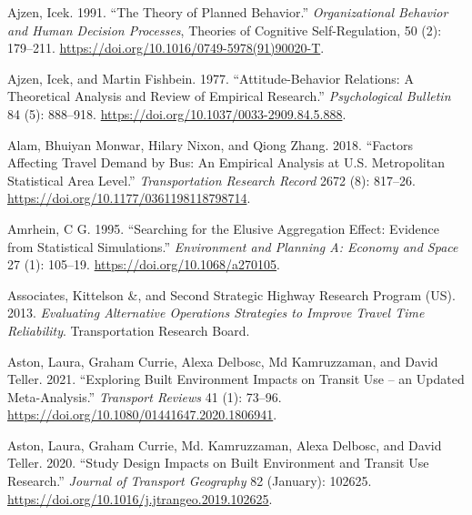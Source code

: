 \documentclass[
  12pt,
]{article}
\newlength{\cslhangindent}
\newlength{\cslentryspacingunit} %
\newenvironment{CSLReferences}[2] %
 {%
  \setlength{\parindent}{0pt}
  \ifodd #1
  \let\oldpar\par
  \def\par{\hangindent=\cslhangindent\oldpar}
  \fi
  \setlength{\parskip}{#2\cslentryspacingunit}
 }%
 {}
\begin{document}
\hypertarget{refs}{}
\begin{CSLReferences}{1}{0}
\leavevmode{}%
Ajzen, Icek. 1991. {``The Theory of Planned Behavior.''} \emph{Organizational Behavior and Human Decision Processes}, Theories of {Cognitive Self-Regulation}, 50 (2): 179--211. \url{https://doi.org/10.1016/0749-5978(91)90020-T}.

\leavevmode{}%
Ajzen, Icek, and Martin Fishbein. 1977. {``Attitude-Behavior Relations: {A} Theoretical Analysis and Review of Empirical Research.''} \emph{Psychological Bulletin} 84 (5): 888--918. \url{https://doi.org/10.1037/0033-2909.84.5.888}.

\leavevmode{}%
Alam, Bhuiyan Monwar, Hilary Nixon, and Qiong Zhang. 2018. {``Factors {Affecting Travel Demand} by {Bus}: {An Empirical Analysis} at {U}.{S}. {Metropolitan Statistical Area Level}.''} \emph{Transportation Research Record} 2672 (8): 817--26. \url{https://doi.org/10.1177/0361198118798714}.

\leavevmode{}%
Amrhein, C G. 1995. {``Searching for the {Elusive Aggregation Effect}: {Evidence} from {Statistical Simulations}.''} \emph{Environment and Planning A: Economy and Space} 27 (1): 105--19. \url{https://doi.org/10.1068/a270105}.

\leavevmode{}%
Associates, Kittelson \&, and Second Strategic Highway Research Program (US). 2013. \emph{Evaluating Alternative Operations Strategies to Improve Travel Time Reliability}. Transportation Research Board.

\leavevmode{}%
Aston, Laura, Graham Currie, Alexa Delbosc, Md Kamruzzaman, and David Teller. 2021. {``Exploring Built Environment Impacts on Transit Use -- an Updated Meta-Analysis.''} \emph{Transport Reviews} 41 (1): 73--96. \url{https://doi.org/10.1080/01441647.2020.1806941}.

\leavevmode{}%
Aston, Laura, Graham Currie, Md. Kamruzzaman, Alexa Delbosc, and David Teller. 2020. {``Study Design Impacts on Built Environment and Transit Use Research.''} \emph{Journal of Transport Geography} 82 (January): 102625. \url{https://doi.org/10.1016/j.jtrangeo.2019.102625}.


\end{CSLReferences}
\end{document}
